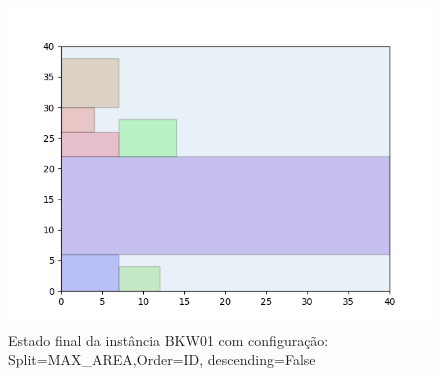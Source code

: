 \begin{figure}[H]
    \centering
    \caption[]{Estado final da instância BKW01 com configuração: Split=MAX_AREA,Order=ID, descending=False}
    \label{fig:bkw01-max_area-id-false}
    \includegraphics[scale=0.5]{output/figures/bkw/bkw01/max_area/id/false/00}
\end{figure}